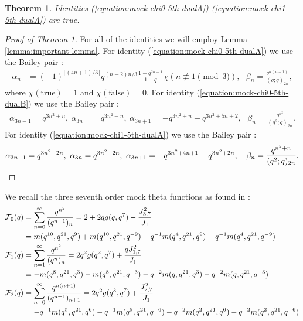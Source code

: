\documentclass[12pt,reqno]{amsart}
\newtheorem{theorem}{Theorem}
\theoremstyle{remark}
\theoremstyle{definition}
\numberwithin{theorem}{section} \numberwithin{equation}{section}
\numberwithin{example}{section}
\begin{document}
{\begin{theorem}\label{theorem:fifth-duals}  Identities (\ref{equation:mock-chi0-5th-dualA})-(\ref{equation:mock-chi1-5th-dualA}) are true.
\end{theorem}
\begin{proof}[Proof of Theorem \ref{theorem:fifth-duals}]  For all of the identities we will employ Lemma \ref{lemma:important-lemma}.  For identity (\ref{equation:mock-chi0-5th-dualA}) we use the Bailey pair \cite[p. $12$]{Wa1}:
\begin{align*}
\alpha_n&=(-1)^{\lfloor (4n+1)/3 \rfloor}q^{(n-2)n/3}\frac{1-q^{2n+1}}{1-q}\chi(n\not\equiv 1 \pmod 3),\ \ \ \beta_n=\frac{q^{n(n-1)}}{(q;q)_{2n}},
\end{align*}
where $\chi(\text{true})=1$ and $\chi(\text{false})=0$.  For identity (\ref{equation:mock-chi0-5th-dualB}) we use the Bailey pair \cite[A6]{S}:
\begin{align*}
\alpha_{3n-1}=q^{3n^2+n}, \ \alpha_{3n}&=q^{3n^2-n}, \ \alpha_{3n+1}=-q^{3n^2+n}-q^{3n^2+5n+2},
\ \ \ \beta_n=\frac{q^{n^2}}{(q^2;q)_{2n}}.
\end{align*}
 For identity (\ref{equation:mock-chi1-5th-dualA}) we use the Bailey pair \cite[A8]{S}:
\begin{equation*}
\alpha_{3n-1}=q^{3n^2-2n}, \ \alpha_{3n}=q^{3n^2+2n}, \ \alpha_{3n+1}=-q^{3n^2+4n+1}-q^{3n^2+2n},\ \ \ 
\beta_n=\frac{q^{n^2+n}}{(q^2;q)_{2n}}.\qedhere
\end{equation*}
\end{proof}
We recall the three seventh order mock theta functions as found in \cite[Section $4$]{HM}:
 \begin{align}
{\mathcal{F}}_0(q)&=\sum_{n= 0}^{\infty}\frac{q^{n^2}}{(q^{n+1})_{n}}=2+2qg(q,q^{7})-\frac{J_{3,7}^2}{J_1}\label{equation:mock-F0-7th}\\
&=m(q^{10},q^{21},q^9)+m(q^{10},q^{21},q^{-9})-q^{-1}m(q^{4},q^{21},q^9)-q^{-1}m(q^{4},q^{21},q^{-9}) \notag\\
{\mathcal{F}}_1(q)&=\sum_{n= 1}^{\infty}\frac{q^{n^2}}{(q^{n})_{n}}=2q^2g(q^2,q^{7})+\frac{qJ_{1,7}^2}{J_1}\label{equation:mock-F1-7th}\\
&=-m(q^{8},q^{21},q^3)-m(q^{8},q^{21},q^{-3})-q^{-2}m(q,q^{21},q^3)-q^{-2}m(q,q^{21},q^{-3}) \notag\\
{\mathcal{F}}_2(q)&=\sum_{n= 0}^{\infty}\frac{q^{n(n+1)}}{(q^{n+1})_{n+1}}=2q^2g(q^3,q^{7})+\frac{J_{2,7}^2}{J_1}\label{mock-F2-7th}\\
&=-q^{-1}m(q^{5},q^{21},q^6)-q^{-1}m(q^{5},q^{21},q^{-6})-q^{-2}m(q^2,q^{21},q^6)-q^{-2}m(q^2,q^{21},q^{-6}) \notag

\end{align}}
\end{document}
